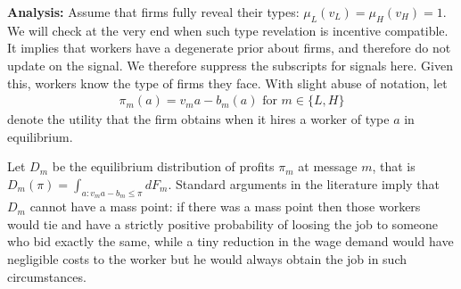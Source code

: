 \documentclass[12pt]{article}
\begin{document}
\textbf{Analysis:}
Assume that firms fully reveal their types: $\mu_{L}(v_{L})=\mu _{H}(v_{H})=1.$
We will check at the very end when such type revelation is incentive compatible.
It implies that workers have a degenerate prior about firms, and therefore do not update on the signal.
We therefore suppress the subscripts for signals here.
Given this, workers know the type of firms they face.
With slight abuse of notation, let 
\begin{align*}
\pi _{m}(a)=v_{m}a-b_{m}(a)\text{ for }m\in \{L,H\} 
\end{align*}
denote the utility that the firm obtains when it hires a worker of type $a$ in equilibrium.

Let $D_{m}$ be the equilibrium distribution of profits $\pi _{m}$ at message  $m$, that is $D_{m}(\pi )=\int_{a:v_{m}a-b_{m}\leq \pi }dF_{m}.$
Standard arguments in the literature imply that $D_{m}$ cannot have a mass point:
if there was a mass point then those workers would tie and have a strictly positive probability of loosing the job to someone who bid exactly the same, while a tiny reduction in the wage demand would have negligible costs to the worker but he would always obtain the job in such circumstances.
\end{document}

